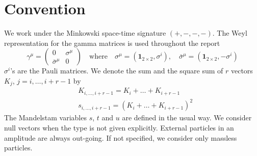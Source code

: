 \section*{Convention}
We work under the Minkowski space-time signature $(+,-,-,-)$.
The Weyl representation for the gamma matrices is used throughout the report
\begin{equation}
\gamma^\mu = \begin{pmatrix}
0 & \sigma^\mu \\
\bar{\sigma}^\mu & 0
\end{pmatrix}
\quad\mathrm{where}\quad
\sigma^\mu = (\mathbf{1}_{2\times 2}, \sigma^i)
,\quad
\bar{\sigma}^\mu = (\mathbf{1}_{2\times 2}, -\sigma^i)
\end{equation}
$\sigma^i$'s are the Pauli matrices.
We denote the sum and the square sum of $r$ vectors $K_j$, $j=i,\ldots, i+r-1$ by
\begin{equation}
\begin{split}
& K_{i,\ldots,i+r-1} = K_i +\ldots + K_{i+r-1}
\\
& s_{i,\ldots , i+r-1} = (K_i+\ldots + K_{i+r-1})^2
\end{split}
\end{equation}
The Mandelstam variables $s$, $t$ and $u$ are defined in the usual way.
We consider null vectors when the type is not given explicitly.
External particles in an amplitude are always out-going.
If not specified, we consider only massless particles.








